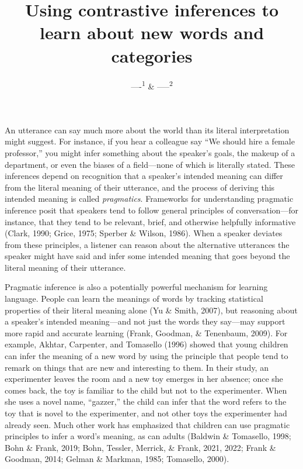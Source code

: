 \documentclass[
  english,
  man,floatsintext]{apa6}
\title{Using contrastive inferences to learn about new words and categories}
\author{----\textsuperscript{1} \& -----\textsuperscript{2}}
\date{}
\affiliation{\vspace{0.5cm}\textsuperscript{1} ------\\\textsuperscript{2} ------}
\begin{document}
\maketitle

An utterance can say much more about the world than its literal interpretation might suggest. For instance, if you hear a colleague say ``We should hire a female professor,'' you might infer something about the speaker's goals, the makeup of a department, or even the biases of a field---none of which is literally stated. These inferences depend on recognition that a speaker's intended meaning can differ from the literal meaning of their utterance, and the process of deriving this intended meaning is called \emph{pragmatics}. Frameworks for understanding pragmatic inference posit that speakers tend to follow general principles of conversation---for instance, that they tend to be relevant, brief, and otherwise helpfully informative (Clark, 1990; Grice, 1975; Sperber \& Wilson, 1986). When a speaker deviates from these principles, a listener can reason about the alternative utterances the speaker might have said and infer some intended meaning that goes beyond the literal meaning of their utterance.

Pragmatic inference is also a potentially powerful mechanism for learning language. People can learn the meanings of words by tracking statistical properties of their literal meaning alone (Yu \& Smith, 2007), but reasoning about a speaker's intended meaning---and not just the words they say---may support more rapid and accurate learning (Frank, Goodman, \& Tenenbaum, 2009). For example, Akhtar, Carpenter, and Tomasello (1996) showed that young children can infer the meaning of a new word by using the principle that people tend to remark on things that are new and interesting to them. In their study, an experimenter leaves the room and a new toy emerges in her absence; once she comes back, the toy is familiar to the child but not to the experimenter. When she uses a novel name, ``gazzer,'' the child can infer that the word refers to the toy that is novel to the experimenter, and not other toys the experimenter had already seen. Much other work has emphasized that children can use pragmatic principles to infer a word's meaning, as can adults (Baldwin \& Tomasello, 1998; Bohn \& Frank, 2019; Bohn, Tessler, Merrick, \& Frank, 2021, 2022; Frank \& Goodman, 2014; Gelman \& Markman, 1985; Tomasello, 2000).
\end{document}
